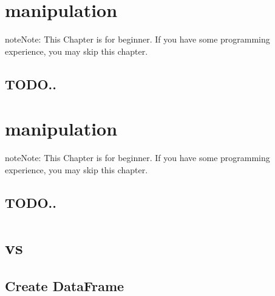 \documentclass[letterpaper,12pt,english]{sphinxmanual}
\begin{document}
\chapter{ manipulation}
\label{\detokenize{pd:pd-dataframe-manipulation}}\label{\detokenize{pd:pd}}\label{\detokenize{pd::doc}}
\begin{sphinxadmonition}{note}{Note:}
This Chapter {\hyperref[\detokenize{nb:nb}]{}} is for beginner.  If you have some  programming experience, you may skip this chapter.
\end{sphinxadmonition}


\section{TODO..}
\label{\detokenize{pd:todo}}

\chapter{ manipulation}
\label{\detokenize{rdd:rdd-dataframe-manipulation}}\label{\detokenize{rdd:rdd}}\label{\detokenize{rdd::doc}}
\begin{sphinxadmonition}{note}{Note:}
This Chapter {\hyperref[\detokenize{nb:nb}]{}} is for beginner.  If you have some  programming experience, you may skip this chapter.
\end{sphinxadmonition}


\section{TODO..}
\label{\detokenize{rdd:todo}}

\chapter{ vs }
\label{\detokenize{pdrdd:pd-dataframe-vs-pd-dataframe}}\label{\detokenize{pdrdd:pdrdd}}\label{\detokenize{pdrdd::doc}}

\section{Create DataFrame}
\label{\detokenize{pdrdd:create-dataframe}}
\end{document}
